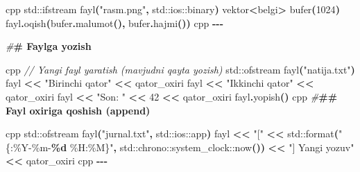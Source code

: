 \documentclass[a4paper,11pt,twoside,openright]{book}
\newenvironment{Shaded}{\begin{snugshade}}{\end{snugshade}}
\newcommand{\BuiltInTok}[1]{#1}
\newcommand{\CommentTok}[1]{\textcolor[rgb]{0.56,0.35,0.01}{\textit{#1}}}
\newcommand{\DecValTok}[1]{\textcolor[rgb]{0.00,0.00,0.81}{#1}}
\newcommand{\ErrorTok}[1]{\textcolor[rgb]{0.64,0.00,0.00}{\textbf{#1}}}
\newcommand{\NormalTok}[1]{#1}
\newcommand{\OperatorTok}[1]{\textcolor[rgb]{0.81,0.36,0.00}{\textbf{#1}}}
\newcommand{\PreprocessorTok}[1]{\textcolor[rgb]{0.56,0.35,0.01}{\textit{#1}}}
\newcommand{\SpecialCharTok}[1]{\textcolor[rgb]{0.81,0.36,0.00}{\textbf{#1}}}
\newcommand{\StringTok}[1]{\textcolor[rgb]{0.31,0.60,0.02}{#1}}
\begin{document}
\begin{Shaded}
\begin{Highlighting}[]
\ErrorTok{\textasciigrave{}\textasciigrave{}\textasciigrave{}}\NormalTok{cpp}
\BuiltInTok{std::}\NormalTok{ifstream fayl}\OperatorTok{(}\StringTok{"rasm.png"}\OperatorTok{,} \BuiltInTok{std::}\NormalTok{ios::binary}\OperatorTok{)}
\NormalTok{vektor}\OperatorTok{\textless{}}\NormalTok{belgi}\OperatorTok{\textgreater{}}\NormalTok{ bufer}\OperatorTok{(}\DecValTok{1024}\OperatorTok{)}
\NormalTok{fayl}\OperatorTok{.}\NormalTok{oqish}\OperatorTok{(}\NormalTok{bufer}\OperatorTok{.}\NormalTok{malumot}\OperatorTok{(),}\NormalTok{ bufer}\OperatorTok{.}\NormalTok{hajmi}\OperatorTok{())}
\ErrorTok{\textasciigrave{}\textasciigrave{}\textasciigrave{}}\NormalTok{cpp}
\OperatorTok{{-}{-}{-}}

\PreprocessorTok{\#}\ErrorTok{\# Faylga yozish}

\ErrorTok{\textasciigrave{}\textasciigrave{}\textasciigrave{}}\NormalTok{cpp}
\CommentTok{// Yangi fayl yaratish (mavjudni qayta yozish)}
\BuiltInTok{std::}\NormalTok{ofstream fayl}\OperatorTok{(}\StringTok{"natija.txt"}\OperatorTok{)}
\NormalTok{fayl }\OperatorTok{\textless{}\textless{}} \StringTok{"Birinchi qator"} \OperatorTok{\textless{}\textless{}}\NormalTok{ qator\_oxiri}
\NormalTok{fayl }\OperatorTok{\textless{}\textless{}} \StringTok{"Ikkinchi qator"} \OperatorTok{\textless{}\textless{}}\NormalTok{ qator\_oxiri}
\NormalTok{fayl }\OperatorTok{\textless{}\textless{}} \StringTok{"Son: "} \OperatorTok{\textless{}\textless{}} \DecValTok{42} \OperatorTok{\textless{}\textless{}}\NormalTok{ qator\_oxiri}
\NormalTok{fayl}\OperatorTok{.}\NormalTok{yopish}\OperatorTok{()}
\ErrorTok{\textasciigrave{}\textasciigrave{}\textasciigrave{}}\NormalTok{cpp}
\PreprocessorTok{\#}\ErrorTok{\#\# Fayl oxiriga qo\textquotesingle{}shish (append)}

\ErrorTok{\textasciigrave{}\textasciigrave{}\textasciigrave{}}\NormalTok{cpp}
\BuiltInTok{std::}\NormalTok{ofstream fayl}\OperatorTok{(}\StringTok{"jurnal.txt"}\OperatorTok{,} \BuiltInTok{std::}\NormalTok{ios::app}\OperatorTok{)}
\NormalTok{fayl }\OperatorTok{\textless{}\textless{}} \StringTok{"["} \OperatorTok{\textless{}\textless{}} \BuiltInTok{std::}\NormalTok{format}\OperatorTok{(}\StringTok{"\{:\%Y{-}\%m{-}}\SpecialCharTok{\%d}\StringTok{ \%H:\%M\}"}\OperatorTok{,} \BuiltInTok{std::}\NormalTok{chrono::system\_clock::now}\OperatorTok{())} \OperatorTok{\textless{}\textless{}} \StringTok{"] Yangi yozuv"} \OperatorTok{\textless{}\textless{}}\NormalTok{ qator\_oxiri}
\ErrorTok{\textasciigrave{}\textasciigrave{}\textasciigrave{}}\NormalTok{cpp}
\OperatorTok{{-}{-}{-}}


\end{Highlighting}
\end{Shaded}
\end{document}

